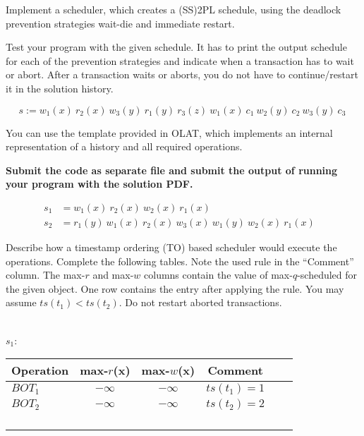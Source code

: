Implement a scheduler, which creates a (SS)2PL schedule, using the deadlock prevention strategies wait-die and immediate restart.

Test your program with the given schedule.
It has to print the output schedule for each of the prevention strategies and indicate when a transaction has to wait or abort.
After a transaction waits or aborts, you do not have to continue/restart it in the solution history.

$$s :=w_1(x)\ r_2(x)\ w_3(y)\ r_1(y)\ r_3(z)\ w_1(x)\ c_1\ w_2(y)\ c_2\ w_3(y)\ c_3\ $$

You can use the template provided in OLAT, which implements an internal representation of a history and all required operations.

\textbf{Submit the code as separate file and submit the output of running your program with the solution PDF.}

\newpage
{}

\begin{align*}
s_{1} &= w_1(x) \ r_2(x) \ w_2(x) \ r_1(x) &\\
s_{2} &= r_1(y) \ w_1(x)  \ r_2(x) \ w_3(x) \ w_1(y) \ w_2(x) \ r_1(x)
\end{align*}

Describe how a timestamp ordering (TO) based scheduler would execute the operations.
Complete the following tables.
Note the used rule in the ``Comment'' column.
The max-$r$ and max-$w$ columns contain the value of max-$q$-scheduled for the given object.
One row contains the entry after applying the rule.
You may assume $ts(t_1) < ts(t_2)$.
Do not restart aborted transactions.

\ \\

$s_1$:
\begin{table}[h]
\centering
\begin{tabular}{|l|c|c|c|c|l|}
\hline
Operation & max-$r$(x) & max-$w$(x) & Comment \\
\hline\hline
$BOT_1$ & $-\infty$ & $-\infty$ &  $ts(t_1) = 1$ \\ \hline
$BOT_2$ & $-\infty$ & $-\infty$ &  $ts(t_2) = 2$ \\ \hline
& & &  \\[5pt]\hline
& & &  \\[5pt]\hline
& & &  \\[5pt]\hline
& & &  \\[5pt]\hline
\end{tabular}
\end{table}

